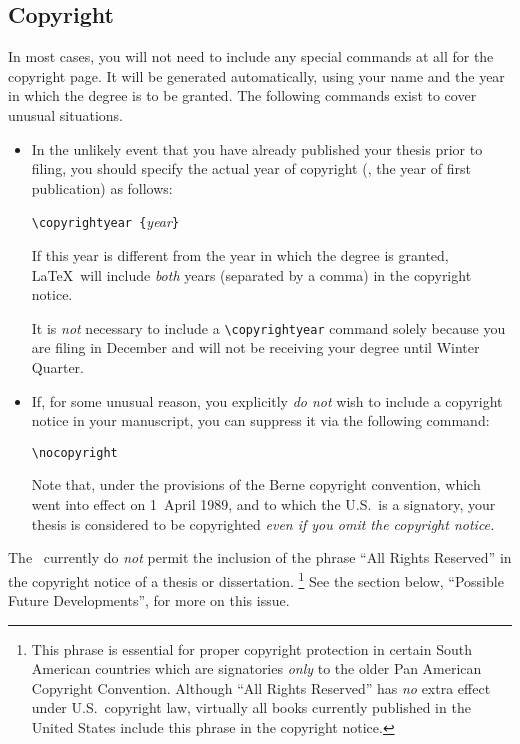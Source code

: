 \subsection {Copyright}

In most cases,
you will not need to include any special commands at all
for the copyright page.
It will be generated automatically, using your name
and the year in which the degree is to be granted.
The following commands exist to cover unusual situations.

\begin {itemize}

\item
In the unlikely event that you have already
published your thesis prior to filing,
you should specify the actual year of copyright
(\ie, the year of first publication) as follows:

\begin {center}
\verb+\copyrightyear {+{\sl year\/}\verb+}+
\end {center}

If this year is different from the year
in which the degree is granted,
\LaTeX\ will include {\em both\/} years (separated by a comma)
in the copyright notice.

It is {\em not\/} necessary
to include a \verb+\copyrightyear+ command
solely because you are filing in December
and will not be receiving your degree until Winter Quarter.

\item
If, for some unusual reason,
you explicitly {\em do not\/} wish to include
a copyright notice in your manuscript,
you can suppress it via the following command:

\begin {center} \verb+\nocopyright+ \end {center}

Note that, under the provisions of the Berne copyright convention,
which went into effect on 1~April 1989, and to which the U.S.\ is a
signatory, your thesis is considered to be copyrighted
{\em even if you omit the copyright notice.}

\end {itemize}

The \regs\ currently do {\em not\/} permit the inclusion of the
phrase ``All Rights Reserved'' in the copyright notice of a
thesis or dissertation.%
\footnote {This phrase is essential for proper copyright protection
in certain South American countries which are signatories {\em only\/}
to the older Pan American Copyright Convention.
Although ``All Rights Reserved'' has {\em no\/} extra effect
under U.S.\ copyright law, virtually all books currently published
in the United States include this phrase in the copyright notice.}
See the section below, ``Possible Future Developments'',
for more on this issue.

